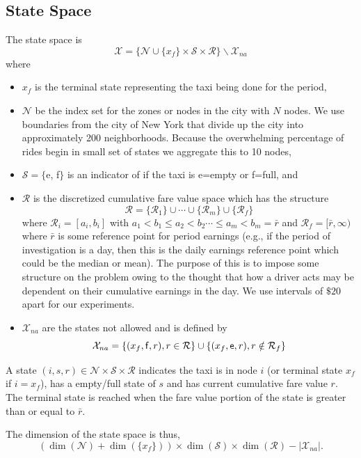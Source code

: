 \documentclass{article}
\newcommand{\mc}{\mathcal}
\newcommand{\e}{{\sf e}}
\newcommand{\f}{{\sf f}}
\begin{document}
\subsection{State Space}
The state space is
\[\mc{X}=\{\mc{N}\cup\{x_f\}\times\mc{S}\times \mc{R}\}\backslash \mc{X}_{na}\]
where
\begin{itemize}
\item $x_f$ is the terminal state representing the taxi being done for the period,

\item $\mc{N}$ be the index set for the zones or nodes in the city with $N$ nodes. We use boundaries from the city of New York that divide up the city into approximately 200 neighborhoods. Because the overwhelming percentage of rides begin in small set of states we aggregate this to 10 nodes,

\item $\mc{S}=\{${\e, \f}$\}$ is an indicator of if the taxi is \e=empty or \f=full, and

\item $\mc{R}$ is the discretized cumulative fare value space which has the
structure \[\mc{R}=\{\mc{R}_1\}\cup\cdots\cup\{\mc{R}_m\}\cup\{\mc{R}_f\}\]
where $\mc{R}_i=[a_i,b_i]$ with $a_1< b_1\leq a_2<b_2 \cdots \leq a_m<
b_m=\bar{r}$ and $\mc{R}_f=[\bar{r}, \infty)$ where $\bar{r}$ is some reference point for period earnings (e.g., if the period of investigation is a day, then this is the daily earnings reference point which could be the median or mean). The purpose of this is to impose some structure on the problem owing to the thought that how a driver acts may be dependent on their cumulative earnings in the day. We use intervals of $\$20$ apart for our experiments.

\item $\mc{X}_{na}$ are the states not allowed and is defined by
\[\mc{X}_{na}=\{(x_f,\f,r), r\in \mc{R}\}\cup\{(x_f,\e,r), r\notin\mc{R}_f\}\]
\end{itemize}
   
A state $(i,s,r)\in \mc{N}\times\mc{S}\times \mc{R}$ indicates the taxi
is in node $i$ (or terminal state $x_f$ if $i=x_f$), has a empty/full state of $s$ and has current cumulative
fare value $r$. The terminal state is reached when the fare value portion of the
state is greater than or equal to $\bar{r}$. 

The dimension of the state space is thus, 
\[(\dim(\mc{N})+\dim(\{x_f\}))\times\dim(\mc{S})\times\dim(\mc{R})-|\mc{X}_{na}|.\]
\end{document}
